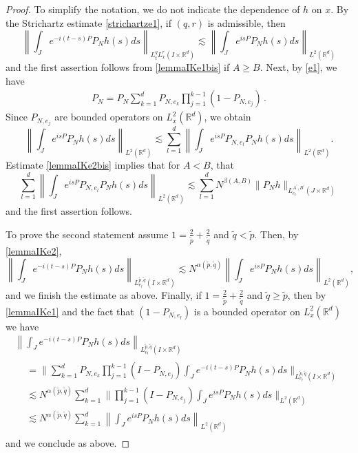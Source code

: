 \documentclass[10pt,leqno]{amsart}
\newcommand{\R}{\mathbb{R}} %
\numberwithin{equation}{section}
\begin{document}
\begin{proof}
To simplify the notation, we do not indicate the dependence of $h$ on $x$. 
By the Strichartz estimate \eqref{strichartze1}, if $(q,r)$ is admissible, then
$$\left\|\int_J e^{-i(t-s) P} P_N h(s) ds\right\|_{L_t^q L_x^r (I\times \R^d)} \lesssim \left\|\int_J e^{is P } P_N h(s) ds\right\|_{L^2 (\R^d)} $$
and the first assertion follows from \eqref{lemmaIKe1bis} if $A \geq B$.
Next, by \eqref{e1}, we have
\begin{align*}
P_N 
= P_{N} \sum_{k = 1}^d P_{N, e_k} \prod_{j = 1}^{k - 1}(1 - P_{N, e_j}) \,.
\end{align*}
Since $P_{N,e_j}$ are bounded operators on $L^2_x (\R^d )$, we obtain  
$$
\left\|\int_J e^{is P } P_N h(s) ds\right\|_{L^2 (\R^d )} \lesssim \sum^{d}_{l=1}\left\|\int_J e^{is P} P_{N,e_l} P_N h(s) ds\right\|_{L^2 (\R^d )}.
$$
 Estimate \eqref{lemmaIKe2bis} implies that for $ A < B$, that 
$$\sum_{l=1}^d  \left\|\int_J e^{is P} P_{N,e_l} P_N h(s) ds \right\|_{L^2 (\R^d )} \lesssim \sum_{l=1}^d N^{\beta (A,B)} \|P_N h\|_{L_{e_l}^{A^\prime ,B^\prime} (J\times \R^d )}$$
and the first assertion follows. 


To prove the second statement assume $1= \frac{2}{\tilde{p}} +\frac{2}{\tilde{q}}$ and $\tilde{q} < \tilde{p}$. Then, by 
\eqref{lemmaIKe2}, 
\begin{equation}
\label{line1}
\left\|\int_J e^{-i(t-s) P} P_N h(s) ds \right\|_{L_{e_l}^{\tilde p, \tilde q} (I\times \R^d)}\lesssim N^{\alpha ( \tilde{p},\tilde q)}  \left\|\int_J e^{is P } P_N h(s) ds \right \|_{L^2 (\R^d)} ,
\end{equation}
and we finish the estimate as above. Finally, if $1= \frac{2}{\tilde{p}} +\frac{2}{\tilde{q}}$ and $\tilde{q} \geq \tilde{p}$, then by \eqref{lemmaIKe1} and the fact that $(1-P_{N,e_l})$ is a bounded operator on $L^2_x (\R^d )$ we have 
\begin{multline*}
\left\|\int_J e^{-i(t-s) P} P_N h(s) ds \right\|_{L_{e_l}^{\tilde p, \tilde q} (I\times \R^d)} \\
\begin{aligned}
&=  \Bigg\| \sum_{k = 1}^d P_{N, e_k} \prod_{j = 1}^{k-1} (I - P_{N, e_{j}}) \int_J e^{-i(t -s) P } P_N h(s) ds \Bigg\|_{L_{e_l}^{\tilde p, \tilde q} (I\times \R^d)} \\
&\lesssim N^{\alpha ( \tilde{p},\tilde q)} \sum_{k = 1}^d  \bigg\|  \prod_{j = 1}^{k-1} (I - P_{N, e_{j}}) \int_J e^{is P } P_N h(s) ds \bigg \|_{L^2 (\R^d)} \\
&\lesssim N^{\alpha ( \tilde{p},\tilde q)} \sum_{k = 1}^d  \left\| \int_J e^{is P } P_N h(s) ds \right \|_{L^2 (\R^d)}
\end{aligned}
\end{multline*}
and we conclude as above. 
\end{proof}
\end{document}
